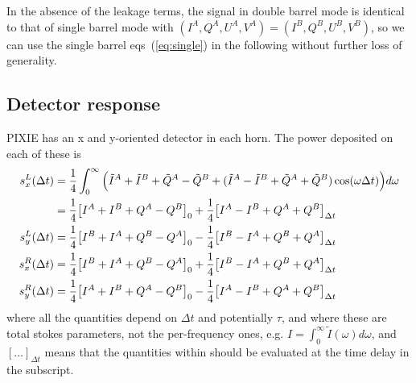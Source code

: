 \documentclass{article}
\newcommand{\I}{\tilde I}
\newcommand{\Q}{\tilde Q}
\begin{document}
In the absence of the leakage terms, the signal in double barrel mode is
identical to that of single barrel mode with $(I^A,Q^A,U^A,V^A)=(I^B,Q^B,U^B,V^B)$,
so we can use the single barrel eqs~(\ref{eq:single}) in the following
without further loss of generality.

\subsection{Detector response}
PIXIE has an x and y-oriented detector in each horn. The power deposited on each
of these is
\begin{align}
	s^L_x(\Delta t)
		&= \frac14 \int_0^\infty\Big(\I^A+\I^B+\Q^A-\Q^B + (\I^A-\I^B+\Q^A+\Q^B)\cos(\omega\Delta t)\Big)d\omega \notag \\
		&= \frac14 \big[I^A+I^B+Q^A-Q^B\big]_0 + \frac14\big[I^A-I^B+Q^A+Q^B\big]_{\Delta t} \notag \\
	s^L_y(\Delta t)
		&= \frac14 \big[I^B+I^A+Q^B-Q^A\big]_0 - \frac14\big[I^B-I^A+Q^B+Q^A\big]_{\Delta t} \notag \\
	s^R_x(\Delta t)
		&= \frac14 \big[I^B+I^A+Q^B-Q^A\big]_0 + \frac14\big[I^B-I^A+Q^B+Q^A\big]_{\Delta t} \notag \\
	s^R_y(\Delta t)
		&= \frac14 \big[I^A+I^B+Q^A-Q^B\big]_0 - \frac14\big[I^A-I^B+Q^A+Q^B\big]_{\Delta t}
\end{align}
where all the quantities depend on $\Delta t$ and potentially $\tau$,
and where these are total stokes parameters, not the per-frequency ones,
e.g. $I = \int_0^\infty \I(\omega) d\omega$, and $[\ldots]_{\Delta t}$
means that the quantities within should be evaluated at the time delay in
the subscript.
\end{document}
